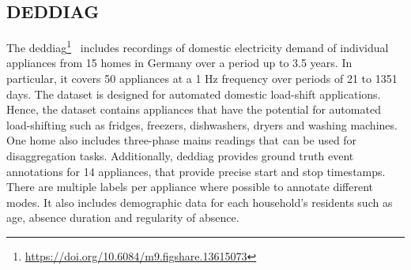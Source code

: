 \newpage

\subsection{DEDDIAG}

The \acrlong{deddiag}\footnote{\url{https://doi.org/10.6084/m9.figshare.13615073}}~\parencite{wenningerDEDDIAGDomesticElectricity2021} includes recordings of domestic electricity demand of individual appliances from 15 homes in Germany over a period up to 3.5 years. In particular, it covers 50 appliances at a 1 Hz frequency over periods of 21 to 1351 days. The dataset is designed for automated domestic load-shift applications. Hence, the dataset contains appliances that have the potential for automated load-shifting such as fridges, freezers, dishwashers, dryers and washing machines. One home also includes three-phase mains readings that can be used for disaggregation tasks. Additionally, \acrshort{deddiag} provides ground truth event annotations for 14 appliances, that provide precise start and stop timestamps. There are multiple labels per appliance where possible to annotate different modes. It also includes demographic data for each household's residents such as age, absence duration and regularity of absence.

